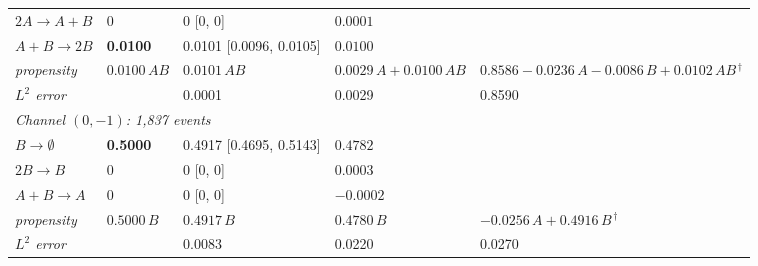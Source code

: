 \begin{table}[htbp]
\begin{tabular}{l l l l l}
\quad $2A\to A+B$ & $0$ & 0 [0, 0] & $0.0001$ &  \\
\quad $A+B\to 2B$ & \textbf{0.0100} & 0.0101 [0.0096, 0.0105] & $0.0100$ &  \\
\cmidrule(l{1.5em}){1-5}
\qquad \textit{propensity} & $0.0100\,AB$ & $0.0101\,AB$ & $0.0029\,A + 0.0100\,AB$ & $0.8586 - 0.0236\,A - 0.0086\,B + 0.0102\,AB{}^{\,\dagger}$ \\
\qquad \textit{$L^2$ error} & & 0.0001 & 0.0029 & 0.8590 \\
\midrule
\multicolumn{5}{l}{\textit{Channel $(0,-1)$: 1{,}837 events}} \\
\quad $B\to \emptyset$ & \textbf{0.5000} & 0.4917 [0.4695, 0.5143] & $0.4782$ &  \\
\quad $2B\to B$ & $0$ & 0 [0, 0] & $0.0003$ &  \\
\quad $A+B\to A$ & $0$ & 0 [0, 0] & $-0.0002$ &  \\
\cmidrule(l{1.5em}){1-5}
\qquad \textit{propensity} & $0.5000\,B$ & $0.4917\,B$ & $0.4780\,B$ & $-0.0256\,A + 0.4916\,B{}^{\,\dagger}$ \\
\qquad \textit{$L^2$ error} & & 0.0083 & 0.0220 & 0.0270 \\
\bottomrule
\end{tabular}
\end{table}
